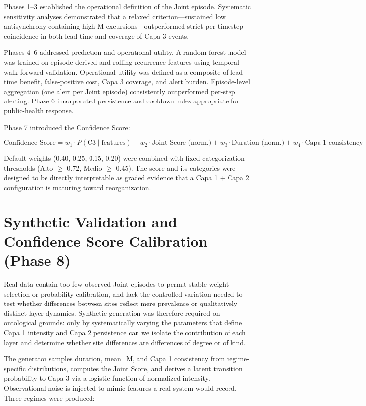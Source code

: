 \documentclass[11pt,a4paper]{article}
\begin{document}
Phases 1--3 established the operational definition of the Joint episode. Systematic sensitivity analyses demonstrated that a relaxed criterion—sustained low antisynchrony containing high-M excursions—outperformed strict per-timestep coincidence in both lead time and coverage of Capa 3 events.

Phases 4--6 addressed prediction and operational utility. A random-forest model was trained on episode-derived and rolling recurrence features using temporal walk-forward validation. Operational utility was defined as a composite of lead-time benefit, false-positive cost, Capa 3 coverage, and alert burden. Episode-level aggregation (one alert per Joint episode) consistently outperformed per-step alerting. Phase 6 incorporated persistence and cooldown rules appropriate for public-health response.

Phase 7 introduced the Confidence Score:

\begin{sloppypar}
\[
\text{Confidence Score} = w_1 \cdot P(\text{C3} \mid \text{features}) + w_2 \cdot \text{Joint Score (norm.)} + w_3 \cdot \text{Duration (norm.)} + w_4 \cdot \text{Capa 1 consistency}
\]
\end{sloppypar}

Default weights (0.40, 0.25, 0.15, 0.20) were combined with fixed categorization thresholds (Alto $\geq$ 0.72, Medio $\geq$ 0.45). The score and its categories were designed to be directly interpretable as graded evidence that a Capa 1 + Capa 2 configuration is maturing toward reorganization.

\section{Synthetic Validation and Confidence Score Calibration (Phase 8)}

Real data contain too few observed Joint episodes to permit stable weight selection or probability calibration, and lack the controlled variation needed to test whether differences between sites reflect mere prevalence or qualitatively distinct layer dynamics. Synthetic generation was therefore required on ontological grounds: only by systematically varying the parameters that define Capa 1 intensity and Capa 2 persistence can we isolate the contribution of each layer and determine whether site differences are differences of degree or of kind.

The generator samples duration, mean\_M, and Capa 1 consistency from regime-specific distributions, computes the Joint Score, and derives a latent transition probability to Capa 3 via a logistic function of normalized intensity. Observational noise is injected to mimic features a real system would record. Three regimes were produced:
\end{document}
